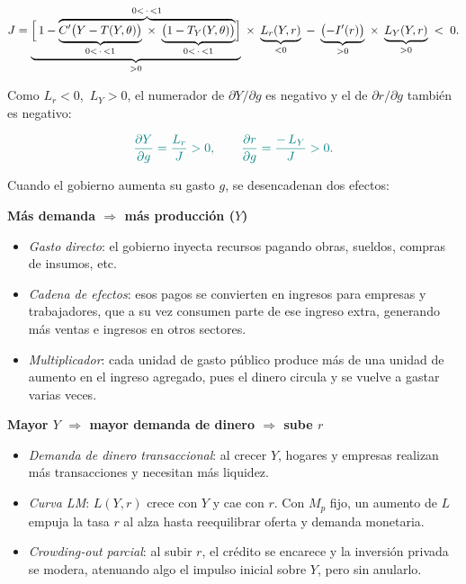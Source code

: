 \documentclass{article}
\begin{document}
\[
J
= 
\underbrace{\Bigl[\,1 
  - 
  \overbrace{%
    \underbrace{C'\bigl(Y - T(Y,\theta)\bigr)}_{0< \,\cdot\, <1}
    \;\times\;
    \underbrace{\bigl(1 - T_Y(Y,\theta)\bigr)}_{0< \,\cdot\, <1}
  }^{0 < \,\cdot\, < 1}
\Bigr]}_{>0}
\;\times\;
\underbrace{L_r(Y,r)}_{<0}
\;-\;
\underbrace{\bigl(-I'(r)\bigr)}_{>0}
\;\times\;
\underbrace{L_Y(Y,r)}_{>0}
\;<\;0.
\]




Como \(L_r<0\), \(\,L_Y>0\), el numerador de \(\partial Y/\partial g\) es negativo y el de \(\partial r/\partial g\) también es negativo:

\[\color{teal}
\frac{\partial Y}{\partial g}
= \frac{L_r}{J}
>0,
\qquad
\frac{\partial r}{\partial g}
= \frac{-\,L_Y}{J}
>0.
\]


\begin{flushleft}
Cuando el gobierno aumenta su gasto \(g\), se desencadenan dos efectos:
\end{flushleft}
\noindent
\textbf{\color{teal}Más demanda \(\Rightarrow\) más producción (\(Y\))}
\begin{itemize}
  \item \emph{\color{teal}Gasto directo}: el gobierno inyecta recursos pagando obras, sueldos, compras de insumos, etc.
  \item \emph{\color{teal}Cadena de efectos}: esos pagos se convierten en ingresos para empresas y trabajadores, que a su vez consumen parte de ese ingreso extra, generando más ventas e ingresos en otros sectores.
  \item \emph{\color{teal}Multiplicador}: cada unidad de gasto público produce más de una unidad de aumento en el ingreso agregado, pues el dinero circula y se vuelve a gastar varias veces.
\end{itemize}

\noindent
\textbf{\color{teal}Mayor \(Y\) \(\Rightarrow\) mayor demanda de dinero \(\Rightarrow\) sube \(r\)}
\begin{itemize}
  \item \emph{\color{teal}Demanda de dinero transaccional}: al crecer \(Y\), hogares y empresas realizan más transacciones y necesitan más liquidez.
  \item \emph{\color{teal}Curva LM}: \(L(Y,r)\) crece con \(Y\) y cae con \(r\). Con \(M_p\) fijo, un aumento de \(L\) empuja la tasa \(r\) al alza hasta reequilibrar oferta y demanda monetaria.
  \item \emph{\color{teal}Crowding‑out parcial}: al subir \(r\), el crédito se encarece y la inversión privada se modera, atenuando algo el impulso inicial sobre \(Y\), pero sin anularlo.
\end{itemize}
\end{document}
